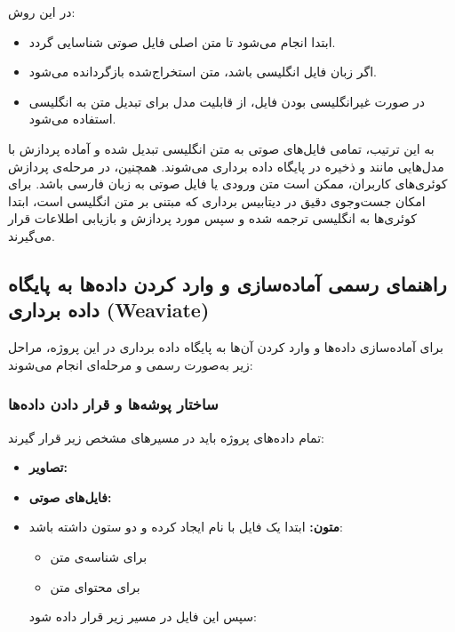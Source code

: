 \documentclass{article}
\begin{document}
در این روش:
\begin{itemize}
\item ابتدا  انجام می‌شود تا متن اصلی فایل صوتی شناسایی گردد.

\item اگر زبان فایل انگلیسی باشد، متن استخراج‌شده بازگردانده می‌شود.

\item در صورت غیرانگلیسی بودن فایل، از قابلیت  مدل  برای تبدیل متن به انگلیسی استفاده می‌شود.

\end{itemize}

به این ترتیب، تمامی فایل‌های صوتی به متن انگلیسی تبدیل شده و آماده پردازش با مدل‌هایی مانند  و ذخیره در پایگاه داده برداری می‌شوند.
همچنین، در مرحله‌ی پردازش کوئری‌های کاربران، ممکن است متن ورودی یا فایل صوتی به زبان فارسی باشد.
برای امکان جست‌وجوی دقیق در دیتابیس برداری که مبتنی بر متن انگلیسی است، ابتدا کوئری‌ها به انگلیسی ترجمه شده و سپس مورد پردازش و بازیابی اطلاعات قرار می‌گیرند.

\subsection{راهنمای رسمی آماده‌سازی و وارد کردن داده‌ها به پایگاه داده برداری (Weaviate)}
برای آماده‌سازی داده‌ها و وارد کردن آن‌ها به پایگاه داده برداری در این پروژه، مراحل زیر به‌صورت رسمی و مرحله‌ای انجام می‌شوند:

\subsubsection{ساختار پوشه‌ها و قرار دادن داده‌ها}

تمام داده‌های پروژه باید در مسیرهای مشخص زیر قرار گیرند:
\begin{itemize}
\item \textbf{تصاویر:} \\
\item \textbf{فایل‌های صوتی:} \\
\item \textbf{متون:} ابتدا یک فایل  با نام  ایجاد کرده و دو ستون داشته باشد:
\begin{itemize}
\item {} برای شناسه‌ی متن
\item {} برای محتوای متن
\end{itemize}
سپس این فایل در مسیر زیر قرار داده شود: \\
\end{itemize}
\end{document}
